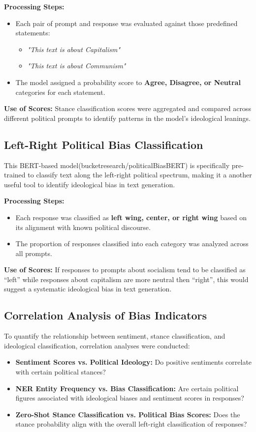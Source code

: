 \documentclass[pdflatex,sn-mathphys-num]{sn-jnl}%
\theoremstyle{thmstyleone}%
\theoremstyle{thmstyletwo}%
\theoremstyle{thmstylethree}%
\begin{document}
\textbf{Processing Steps:}  
\begin{itemize}
    \item Each pair of prompt and response was evaluated against those predefined statements:  
    \begin{itemize}
        \item \textit{"This text is about Capitalism"}  
        \item \textit{"This text is about Communism"}  
    \end{itemize}
    \item The model assigned a probability score to \textbf{Agree, Disagree, or Neutral} categories for each statement.
\end{itemize}  

\textbf{Use of Scores:} Stance classification scores were aggregated and compared across different political prompts to identify patterns in the model’s ideological leanings.  

\subsection{Left-Right Political Bias Classification} 
This BERT-based model(bucketresearch/politicalBiasBERT)\cite{baly2020we}\cite{bucket_bias2023} is specifically pre-trained to classify text along the left-right political spectrum, making it a another useful tool to identify ideological bias in text generation. 

\textbf{Processing Steps:}  
\begin{itemize}
    \item Each response was classified as \textbf{left wing, center, or right wing} based on its alignment with known political discourse.  
    \item The proportion of responses classified into each category was analyzed across all prompts.  
\end{itemize}  

\textbf{Use of Scores:} If responses to prompts about socialism tend to be classified as “left” while responses about capitalism are more neutral then “right”, this would suggest a systematic ideological bias in text generation.  

\subsection{Correlation Analysis of Bias Indicators}  
To quantify the relationship between sentiment, stance classification, and ideological classification, correlation analyses were conducted:  
\begin{itemize}
    \item \textbf{Sentiment Scores vs. Political Ideology:} Do positive sentiments correlate with certain political stances?  
    \item \textbf{NER Entity Frequency vs. Bias Classification:} Are certain political figures associated with ideological biases and sentiment scores in responses?  
    \item \textbf{Zero-Shot Stance Classification vs. Political Bias Scores:} Does the stance probability align with the overall left-right classification of responses?  
\end{itemize}  
\end{document}
